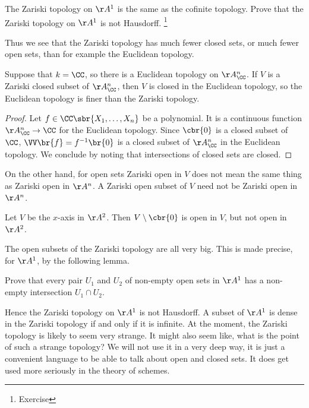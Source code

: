 
\begin{example*}
The Zariski topology on $ \AA^1 $ is the same as the cofinite topology. Prove that the Zariski topology on $ \AA^1 $ is not Hausdorff. \footnote{Exercise}
\end{example*}

Thus we see that the Zariski topology has much fewer closed sets, or much fewer open sets, than for example the Euclidean topology.

\begin{lemma}
Suppose that $ k = \CC $, so there is a Euclidean topology on $ \AA_\CC^n $. If $ V $ is a Zariski closed subset of $ \AA_\CC^n $, then $ V $ is closed in the Euclidean topology, so the Euclidean topology is finer than the Zariski topology.
\end{lemma}

\begin{proof}
Let $ f \in \CC\sbr{X_1, \dots, X_n} $ be a polynomial. It is a continuous function $ \AA_\CC^n \to \CC $ for the Euclidean topology. Since $ \cbr{0} $ is a closed subset of $ \CC $, $ \VV\br{f} = f^{-1}\br{0} $ is a closed subset of $ \AA_\CC^n $ in the Euclidean topology. We conclude by noting that intersections of closed sets are closed.
\end{proof}

\pagebreak

On the other hand, for open sets Zariski open in $ V $ does not mean the same thing as Zariski open in $ \AA^n $. A Zariski open subset of $ V $ need not be Zariski open in $ \AA^n $.

\begin{example*}
Let $ V $ be the $ x $-axis in $ \AA^2 $. Then $ V \setminus \cbr{0} $ is open in $ V $, but not open in $ \AA^2 $.
\end{example*}

The open subsets of the Zariski topology are all very big. This is made precise, for $ \AA^1 $, by the following lemma.

\begin{lemma}
Prove that every pair $ U_1 $ and $ U_2 $ of non-empty open sets in $ \AA^1 $ has a non-empty intersection $ U_1 \cap U_2 $.
\end{lemma}

Hence the Zariski topology on $ \AA^1 $ is not Hausdorff. A subset of $ \AA^1 $ is dense in the Zariski topology if and only if it is infinite. At the moment, the Zariski topology is likely to seem very strange. It might also seem like, what is the point of such a strange topology? We will not use it in a very deep way, it is just a convenient language to be able to talk about open and closed sets. It does get used more seriously in the theory of schemes.

